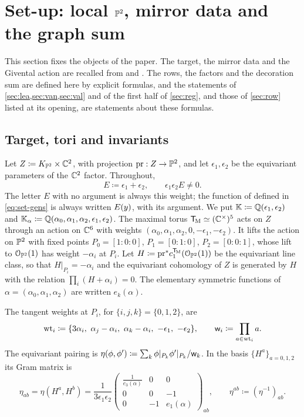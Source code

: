 \section{Set-up: local \texorpdfstring{$\mathbb{P}^2$}{P2}, mirror data and the graph sum}
\label{sec:set}

This section fixes the objects of the paper. The target, the mirror data and the Givental action are recalled from \cite{BS} and \cite{PPZ15}. The rows, the factors and the decoration sum are defined here by explicit formulas, and the statements of \cref{sec:lea,sec:van,sec:val} and of the first half of \cref{sec:reg}, and those of \cref{sec:row} listed at its opening, are statements about these formulas.

\subsection{Target, tori and invariants}
\label{sec:set-target}

Let $Z\coloneqq K_{\mathbb{P}^2}\times\mathbb{C}^2$, with projection $\mathrm{pr}:Z\to\mathbb{P}^2$, and let $\epsilon_1,\epsilon_2$ be the equivariant parameters of the $\mathbb{C}^2$ factor. Throughout,
\[
E\coloneqq\epsilon_1+\epsilon_2,\qquad \epsilon_1\epsilon_2E\neq 0.
\]
The letter $E$ with no argument is always this weight; the function of \cite{BS} defined in \eqref{eq:set-gens} is always written $E(y)$, with its argument. We put $\mathbb{K}\coloneqq\mathbb{Q}(\epsilon_1,\epsilon_2)$ and $\mathbb{K}_{\alpha}\coloneqq\mathbb{Q}(\alpha_0,\alpha_1,\alpha_2,\epsilon_1,\epsilon_2)$. The maximal torus $\mathsf{T}_{\!\mathrm{M}}\simeq(\mathbb{C}^\times)^5$ acts on $Z$ through an action on $\mathbb{C}^6$ with weights $(\alpha_0,\alpha_1,\alpha_2,0,-\epsilon_1,-\epsilon_2)$. It lifts the action on $\mathbb{P}^2$ with fixed points $P_0=[1:0:0]$, $P_1=[0:1:0]$, $P_2=[0:0:1]$, whose lift to $\mathcal{O}_{\mathbb{P}^2}(1)$ has weight $-\alpha_i$ at $P_i$. Let $H\coloneqq\mathrm{pr}^*c_1^{\mathsf{T}_{\!\mathrm{M}}}(\mathcal{O}_{\mathbb{P}^2}(1))$ be the equivariant line class, so that $H|_{P_i}=-\alpha_i$ and the equivariant cohomology of $Z$ is generated by $H$ with the relation $\prod_{i}(H+\alpha_i)=0$. The elementary symmetric functions of $\alpha=(\alpha_0,\alpha_1,\alpha_2)$ are written $e_k(\alpha)$.

The tangent weights at $P_i$, for $\{i,j,k\}=\{0,1,2\}$, are
\[
\wts_i\coloneqq\{3\alpha_i,\ \alpha_j-\alpha_i,\ \alpha_k-\alpha_i,\ -\epsilon_1,\ -\epsilon_2\},
\qquad \wprod_i\coloneqq\prod_{a\in\wts_i}a .
\]
The equivariant pairing is $\eta(\phi,\phi')\coloneqq\sum_{k}\phi|_{P_k}\phi'|_{P_k}/\mathsf{w}_k$. In the basis $\{H^a\}_{a=0,1,2}$ its Gram matrix is
\begin{equation}
\label{eq:set-eta}
\eta_{ab}=\eta(H^a,H^b)=\frac{1}{3\epsilon_1\epsilon_2}
\begin{pmatrix}
\frac{1}{e_3(\alpha)} & 0 & 0\\
0 & 0 & -1\\
0 & -1 & e_1(\alpha)
\end{pmatrix}_{ab},
\qquad \eta^{ab}\coloneqq(\eta^{-1})_{ab}.
\end{equation}

